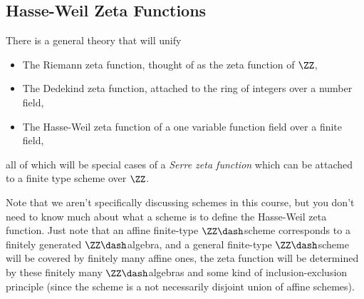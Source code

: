 \hypertarget{hasse-weil-zeta-functions}{%
\subsection{Hasse-Weil Zeta Functions}\label{hasse-weil-zeta-functions}}

There is a general theory that will unify

\begin{itemize}
\item
  The Riemann zeta function, thought of as the zeta function of \(\ZZ\),
\item
  The Dedekind zeta function, attached to the ring of integers over a
  number field,
\item
  The Hasse-Weil zeta function of a one variable function field over a
  finite field,
\end{itemize}

all of which will be special cases of a \emph{Serre zeta function} which
can be attached to a finite type scheme over \(\ZZ\).

Note that we aren't specifically discussing schemes in this course, but
you don't need to know much about what a scheme is to define the
Hasse-Weil zeta function. Just note that an affine finite-type
\(\ZZ\dash\)scheme corresponds to a finitely generated
\(\ZZ\dash\)algebra, and a general finite-type \(\ZZ\dash\)scheme will
be covered by finitely many affine ones, the zeta function will be
determined by these finitely many \(\ZZ\dash\)algebras and some kind of
inclusion-exclusion principle (since the scheme is a not necessarily
disjoint union of affine schemes).

